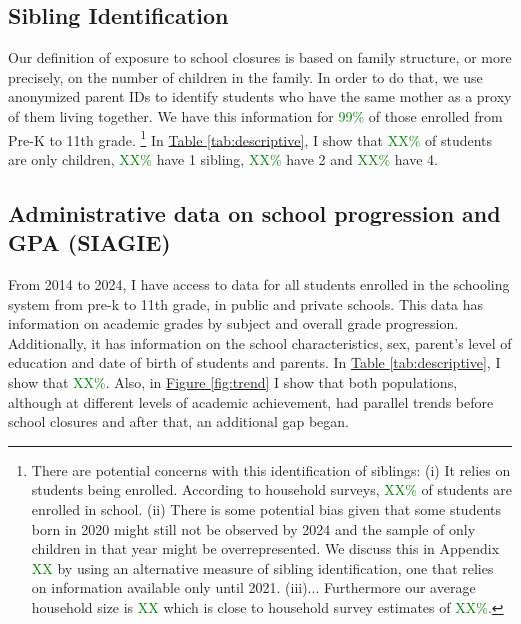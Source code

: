 \subsection{Sibling Identification}

Our definition of exposure to school closures is based on family structure, or more precisely, on the number of children in the family. In order to do that, we use anonymized parent IDs to identify students who have the same mother as a proxy of them living together. We have this information for \textcolor{green}{99\%} of those enrolled from Pre-K to 11th grade. \footnote{There are potential concerns with this identification of siblings: (i) It relies on students being enrolled. According to household surveys, \textcolor{green}{XX\%} of students are enrolled in school. (ii) There is some potential bias given that some students born in 2020 might still not be observed by 2024 and the sample of only children in that year might be overrepresented. We discuss this in Appendix \textcolor{green}{XX} by using an alternative measure of sibling identification, one that relies on information available only until 2021. (iii)... Furthermore our average household size is \textcolor{green}{XX} which is close to household survey estimates of \textcolor{green}{XX\%}.} In \hyperref[tab:descriptive]{Table \ref{tab:descriptive}}, I show that \textcolor{green}{XX\%} of students are only children, \textcolor{green}{XX\%} have 1 sibling, \textcolor{green}{XX\%} have 2 and \textcolor{green}{XX\%} have 4.



\subsection{Administrative data on school progression and GPA (SIAGIE)}

From 2014 to 2024, I have access to data for all students enrolled in the schooling system from pre-k to 11th grade, in public and private schools. This data has information on academic grades by subject and overall grade progression. Additionally, it has information on the school characteristics, sex, parent's level of education and date of birth of students and parents. In \hyperref[tab:descriptive]{Table \ref{tab:descriptive}}, I show that \textcolor{green}{XX\%}. Also, in \hyperref[fig:trend]{Figure \ref{fig:trend}} I show that both populations, although at different levels of academic achievement, had parallel trends before school closures and after that, an additional gap began.

